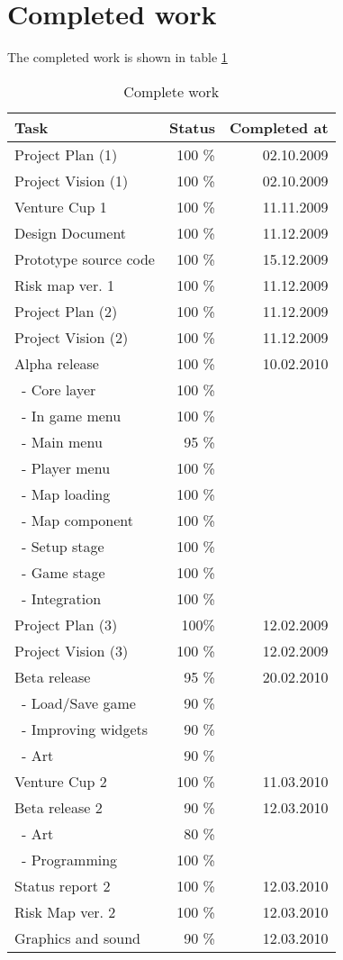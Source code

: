 \documentclass[12pt,a4paper]{article}
\begin{document}
\section{Completed work}

The completed work is shown in table \ref{tab:compwork}

\begin{table}[h!]
\small
\begin{center}
\begin{tabular}{ l | r | r}
Task					&Status	&Completed at\\\hline\hline
Project Plan (1)			&100 \%	&02.10.2009\\
Project Vision (1)		&100 \%	&02.10.2009\\
Venture Cup 1			&100 \%	&11.11.2009\\
Design Document		&100 \%	&11.12.2009\\
Prototype source code	&100 \%	&15.12.2009\\
Risk map ver. 1			&100 \%	&11.12.2009\\
Project Plan (2)			&100 \%	&11.12.2009\\
Project Vision (2)		&100 \%	&11.12.2009\\
Alpha release			&100 \%	&10.02.2010\\
\ - Core layer			&100 \%	&\\
\ - In game menu		&100 \%	&\\
\ - Main menu			&95 \%	&\\
\ - Player menu			&100 \%	&\\
\ - Map loading			&100 \%	&\\
\ - Map component		&100 \%	&\\
\ - Setup stage			&100 \%	&\\
\ - Game stage			&100 \%	&\\
\ - Integration			&100 \%	&\\
Project Plan (3) 		&100\%	&12.02.2009\\
Project Vision (3)		&100 \%	&12.02.2009\\
Beta release			&95 \%	&20.02.2010\\
\ - Load/Save game		&90 \%	&\\
\ - Improving widgets	&90 \%	&\\
\ - Art				&90 \%	&\\
Venture Cup 2			&100 \%	&11.03.2010\\
Beta release 2			&90 \%	&12.03.2010\\
\ - Art				&80 \%	&\\
\ - Programming		&100 \%	&\\
Status report 2			&100 \%	&12.03.2010\\
Risk Map ver. 2		&100 \%	&12.03.2010\\
Graphics and sound		&90 \%	&12.03.2010
\end{tabular}
\end{center}
\caption{Complete work}
\label{tab:compwork}
\end{table}
\end{document}
